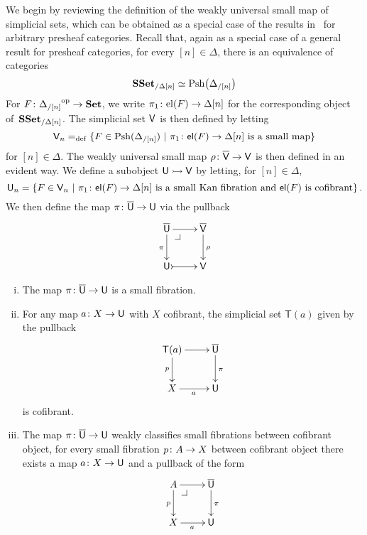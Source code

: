 \documentclass[reqno,10pt,a4paper,oneside,draft]{amsart}
\begin{document}
\bigskip



\medskip

We begin by reviewing the definition of the weakly universal small map of simplicial sets, which
can be obtained as a special case of the results in~\cite{hofmann-streicher-universes} for arbitrary presheaf
categories. Recall that, again as a special case of a general result for presheaf categories, for every $[n] \in \Delta$, there is an equivalence of categories
\begin{equation}
\label{equ:pshslice}
\mathbf{SSet}_{/\Delta[n]} \simeq \mathrm{Psh} \big( \Delta_{/[n]} \big )
\end{equation}
For $F \colon {\Delta_{/[n]}}^{\operatorname{op}} \to \mathbf{Set}$, we write $\pi_1 \colon \mathrm{el}(F) \to \Delta[n]$
for the corresponding object of~$\mathbf{SSet}_{/\Delta[n]}$. The simplicial set $\mathsf{V}$ is then defined by letting
\[
\mathsf{V}_n =_{\operatorname{def}} \{ F \in \mathrm{Psh}(\Delta_{/[n]}) \ | \ \pi_1 \colon \mathsf{el}(F) \to \Delta[n] \text{ is a small
map} \}
\]
for $[n] \in \Delta$. The weakly universal small map $\rho \colon \overline{\mathsf{V}} \to \mathsf{V}$ is then defined in an evident way. 
We define a subobject $\mathsf{U} \rightarrowtail \mathsf{V}$ by letting, for $[n] \in \Delta$, 
\[
\mathsf{U}_n = \{ F \in \mathsf{V}_n \ | \ \pi_1 \colon \mathsf{el}(F) \to \Delta[n] \text{ is a small Kan fibration and $\mathsf{el}(F)$ is cofibrant} \} \, .
\]
We then define the map $\pi \colon \overline{\mathsf{U}} \to \mathsf{U}$ via the pullback 
\[
\xymatrix{
\UU \ar[r] \ar[d]_\pi \drpullback  & \VV \ar[d]^\rho \\
\U \ar@{>->}[r] & \V }
\]




\begin{proposition} \label{thm:universe-u}  \hfill 
\begin{enumerate}[(i)] 
\item The map $\pi \colon \overline{\mathsf{U}} \to \mathsf{U}$ is a small fibration.
\item For any map $a \colon X \rightarrow \mathsf{U}$ with $X$ cofibrant, the 
simplicial set $\mathsf{T}(a)$ given by the pullback
\[
\xymatrix{
\mathsf{T}(a) \ar[r] \ar[d]_p & \UU \ar[d]^\pi \\
X \ar[r]_a & \U }
\]
is cofibrant.
\item The map $\pi \colon \overline{\mathsf{U}} \to \mathsf{U}$ weakly classifies small fibrations between cofibrant object, \ie 
for every small fibration $p \colon A \to X$ between cofibrant object there exists a map 
$a \colon X \to \mathsf{U}$ and a pullback  of the form
\[
\xymatrix{
A \ar[r] \ar[d]_p \drpullback & \UU \ar[d]^\pi \\
X \ar[r]_{a} & \U }
\]
\end{enumerate}
\end{proposition}
\end{document}

